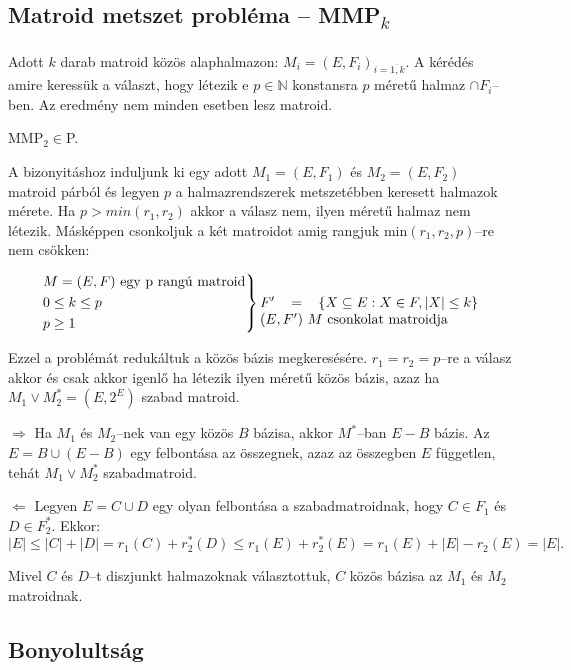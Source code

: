 \subsection{\texorpdfstring{Matroid metszet probléma -- MMP\textsubscript{$k$}}
	{Matroid metszet probléma -- MMPk}}

Adott $k$ darab matroid közös alaphalmazon: $M_i=(E,F_i)_{i=\overline{1,k}}$. A
kérédés amire keressük a választ, hogy létezik e $p \in \mathbb{N}$ konstansra
$p$ méretű halmaz $\cap F_i$--ben. Az eredmény nem minden esetben lesz matroid.

\vspace{0.4cm}
MMP$_2 \in $P.
\vspace{0.4cm}

A bizonyitáshoz induljunk ki egy adott $M_1=(E,F_1)$ és $M_2=(E,F_2)$ matroid
párból és legyen $p$ a halmazrendszerek metszetébben keresett halmazok mérete.
Ha $p>min(r_1, r_2)$ akkor a válasz nem, ilyen méretű halmaz nem létezik.
Másképpen csonkoljuk a két matroidot amig rangjuk min$(r_1,r_2, p)$--re nem
csökken:

\[ \begin{rcases}
		M=(E,F) \mbox{ egy p rangú matroid} \\
		0 \leq k \leq p                     \\
		p \geq 1
	\end{rcases} \parbox[t]{5.5cm}
	{$F' = \left\{ X \subseteq E: X \in F, |X| \leq k \right\}$ %
$(E,F')~M$ csonkolat matroidja} \]

Ezzel a problémát redukáltuk a közös bázis megkeresésére. $r_1=r_2=p$--re a
válasz akkor és csak akkor igenlő ha létezik ilyen méretű közös bázis, azaz ha
$M_1 \vee M_2^*=(E,2^E)$ szabad matroid.

$\Rightarrow$ Ha $M_1$ és $M_2$--nek van egy közös $B$ bázisa, akkor $M^*$--ban
$E-B$ bázis. Az $E=B \cup (E-B)$ egy felbontása az összegnek, azaz az összegben
$E$ független, tehát $M_1 \vee M_2^*$ szabadmatroid.

$\Leftarrow$ Legyen $E=C \cup D$ egy olyan felbontása a szabadmatroidnak, hogy
$C \in F_1$ és $D \in F_2^*$. Ekkor:
\[|E| \leq |C| + |D| = r_1(C) + r_2^*(D) \leq r_1(E)+r_2^*(E) = r_1(E) + |E| - r_2(E)=|E|. \]

Mivel $C$ és $D$--t diszjunkt halmazoknak választottuk, $C$ közös bázisa az $M_1$ és
$M_2$ matroidnak.

\subsection{Bonyolultság}

